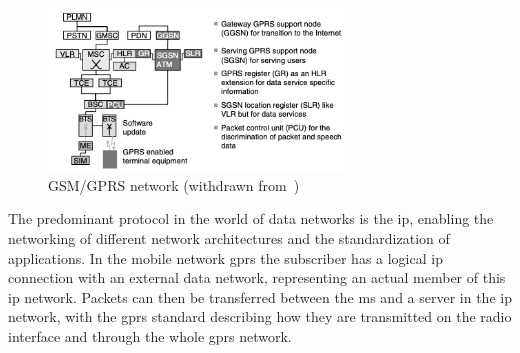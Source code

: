 \begin{figure}[!hbt]
\centering
    \includegraphics[width=0.7\textwidth]{./img/gprs-network.png}
  \caption{GSM/GPRS network (withdrawn from~\cite{sanders2003gprs})}%
\label{fig:gprs-network}
\end{figure}

The predominant protocol in the world of data networks is the \gls{ip}, enabling
the networking of different network architectures and the standardization of
applications. In the mobile network \gls{gprs} the subscriber has a logical
\gls{ip} connection with an external data network, representing an actual member
of this \gls{ip} network. Packets can then be transferred between the \gls{ms}
and a server in the \gls{ip} network, with the \gls{gprs} standard describing
how they are transmitted on the radio interface and through the whole \gls{gprs}
network.

